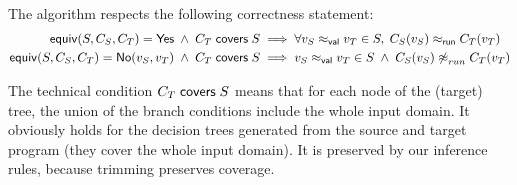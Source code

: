 \documentclass[12pt]{article}
\begin{document}
The algorithm respects the following correctness statement:
\begin{align*}
 \SimpleEquiv S {C_S} {C_T} = \Yes \;\land\; \covers {C_T} S
 & \implies
 \forall {\vrel {v_S} {v_T}} \in S,\; \runrel {C_S(v_S)} {C_T(v_T)}
\\
 \SimpleEquiv S {C_S} {C_T} = \No {v_S} {v_T} \;\land\; \covers {C_T} S
 & \implies
 \vrel {v_S} {v_T} \in S \;\land\; {\nparamrel{run} {C_S(v_S)} {C_T(v_T)}}
\end{align*}

The technical condition $\covers {C_T} S$ means that for each node of the (target) tree, the union of the branch conditions include the whole input domain. It obviously holds for the decision trees generated from the source and target program (they cover the whole input domain). It is preserved by our inference rules, because trimming preserves coverage.
\end{document}
